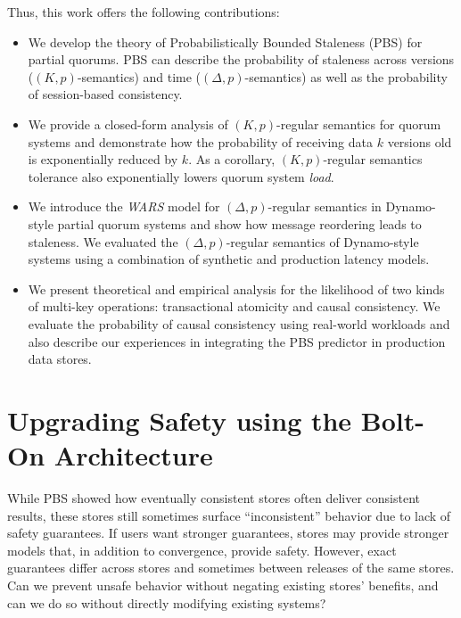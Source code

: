 Thus, this work offers the following contributions:
\begin{itemize}

\item We develop the theory of Probabilistically Bounded Staleness
  (PBS) for partial quorums. PBS can describe the probability of
  staleness across versions ($(K, p)$-semantics) and time ($(\Delta,
  p)$-semantics) as well as the probability of session-based consistency.

\item We provide a closed-form analysis of $(K, p)$-regular semantics
  for quorum systems and demonstrate how the probability of receiving
  data $k$ versions old is exponentially reduced by $k$.  As a
  corollary, $(K, p)$-regular semantics tolerance also exponentially
  lowers quorum system \textit{load}.

\item We introduce the \textit{WARS} model for $(\Delta, p)$-regular
  semantics in Dynamo-style partial quorum systems and show how
  message reordering leads to staleness.  We evaluated the $(\Delta,
  p)$-regular semantics of Dynamo-style systems using a combination of
  synthetic and production latency models.

\item We present theoretical and empirical analysis for the
  likelihood of two kinds of multi-key operations: transactional
  atomicity and causal consistency. We evaluate the probability of
  causal consistency using real-world workloads and also describe our
  experiences in integrating the PBS predictor in production data
  stores.
\end{itemize}

\section{Upgrading Safety using the Bolt-On Architecture}

While PBS showed how eventually consistent stores often deliver
consistent results, these stores still sometimes surface
``inconsistent'' behavior due to lack of safety guarantees. If users
want stronger guarantees, stores may provide stronger models that, in
addition to convergence, provide safety. However, exact guarantees
differ across stores and sometimes between releases of the same
stores. Can we prevent unsafe behavior without negating existing
stores' benefits, and can we do so without directly modifying existing
systems?

